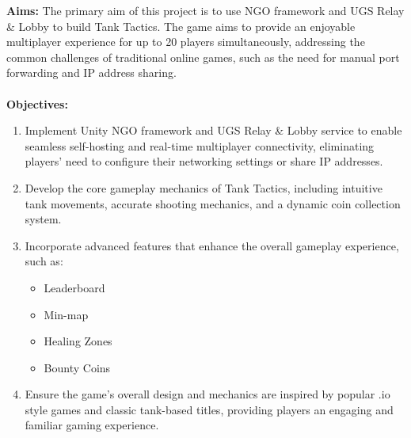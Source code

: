 \textbf{Aims:} The primary aim of this project is to use NGO framework and UGS Relay \& Lobby to build Tank Tactics. The game aims to provide an enjoyable multiplayer experience for up to 20 players simultaneously, addressing the common challenges of traditional online games, such as the need for manual port forwarding and IP address sharing.\\
\\
\textbf{Objectives:}
\begin{enumerate}
    \item Implement Unity NGO framework and UGS Relay \& Lobby service to enable seamless self-hosting and real-time multiplayer connectivity, eliminating players' need to configure their networking settings or share IP addresses.
    \item Develop the core gameplay mechanics of Tank Tactics, including intuitive tank movements, accurate shooting mechanics, and a dynamic coin collection system.
    \item Incorporate advanced features that enhance the overall gameplay experience, such as:
    \begin{itemize}
        \item Leaderboard
        \item Min-map
        \item Healing Zones
        \item Bounty Coins
    \end{itemize}
    \item Ensure the game's overall design and mechanics are inspired by popular .io style games and classic tank-based titles, providing players an engaging and familiar gaming experience.
\end{enumerate}



